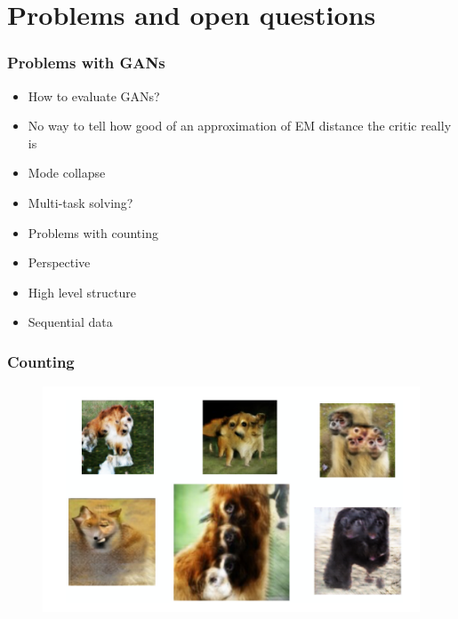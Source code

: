 \documentclass{Bredelebeamer}
\begin{document}

\section{Problems and open questions}
\begin{frame}
	\frametitle{Problems with GANs}
	\begin{itemize}[<+->]
		\item How to evaluate GANs?
		\item No way to tell how good of an approximation of EM distance the critic really is
		\item Mode collapse
		\item Multi-task solving?
		\item Problems with counting
		\item Perspective
		\item High level structure
		\item Sequential data
	\end{itemize}
\end{frame}

\begin{frame} \frametitle{Counting}
	\begin{figure}[h!]
	\centering
	\includegraphics[width=\textwidth]{gan_counting_problem.png}
	\end{figure}
\end{frame}
\end{document}

